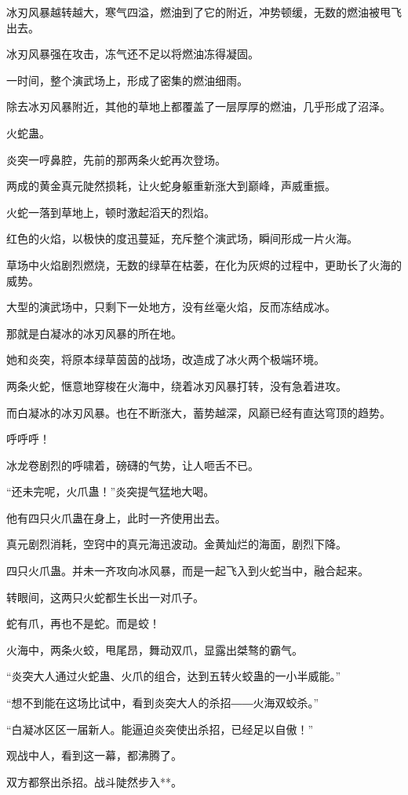 \begin{this_body}
冰刃风暴越转越大，寒气四溢，燃油到了它的附近，冲势顿缓，无数的燃油被甩飞出去。

冰刃风暴强在攻击，冻气还不足以将燃油冻得凝固。

一时间，整个演武场上，形成了密集的燃油细雨。

除去冰刃风暴附近，其他的草地上都覆盖了一层厚厚的燃油，几乎形成了沼泽。

火蛇蛊。

炎突一哼鼻腔，先前的那两条火蛇再次登场。

两成的黄金真元陡然损耗，让火蛇身躯重新涨大到巅峰，声威重振。

火蛇一落到草地上，顿时激起滔天的烈焰。

红色的火焰，以极快的度迅蔓延，充斥整个演武场，瞬间形成一片火海。

草场中火焰剧烈燃烧，无数的绿草在枯萎，在化为灰烬的过程中，更助长了火海的威势。

大型的演武场中，只剩下一处地方，没有丝毫火焰，反而冻结成冰。

那就是白凝冰的冰刃风暴的所在地。

她和炎突，将原本绿草茵茵的战场，改造成了冰火两个极端环境。

两条火蛇，惬意地穿梭在火海中，绕着冰刃风暴打转，没有急着进攻。

而白凝冰的冰刃风暴。也在不断涨大，蓄势越深，风巅已经有直达穹顶的趋势。

呼呼呼！

冰龙卷剧烈的呼啸着，磅礴的气势，让人咂舌不已。

“还未完呢，火爪蛊！”炎突提气猛地大喝。

他有四只火爪蛊在身上，此时一齐使用出去。

真元剧烈消耗，空窍中的真元海迅波动。金黄灿烂的海面，剧烈下降。

四只火爪蛊。并未一齐攻向冰风暴，而是一起飞入到火蛇当中，融合起来。

转眼间，这两只火蛇都生长出一对爪子。

蛇有爪，再也不是蛇。而是蛟！

火海中，两条火蛟，甩尾昂，舞动双爪，显露出桀骜的霸气。

“炎突大人通过火蛇蛊、火爪的组合，达到五转火蛟蛊的一小半威能。”

“想不到能在这场比试中，看到炎突大人的杀招――火海双蛟杀。”

“白凝冰区区一届新人。能逼迫炎突使出杀招，已经足以自傲！”

观战中人，看到这一幕，都沸腾了。

双方都祭出杀招。战斗陡然步入**。


\end{this_body}
